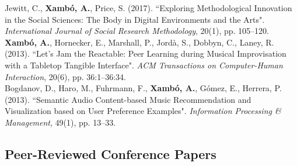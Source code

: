 \documentclass[10pt, a4paper]{article}
\newcommand{\years}[1]{\marginnote{\scriptsize #1}}
\begin{document}
{{\years{2017a}Jewitt, C., \textbf{Xambó, A.}, Price, S. (2017). “Exploring Methodological Innovation in the Social Sciences: The Body in Digital Environments and the Arts". \emph{International Journal of Social Research Methodology},  20(1), pp. 105--120.\\
\years{2013b}\textbf{Xambó, A.}, Hornecker, E., Marshall, P., Jordà, S., Dobbyn, C., Laney, R. (2013). “Let's Jam the Reactable: Peer Learning during Musical Improvisation with a Tabletop Tangible Interface". \emph{ACM Transactions on Computer-Human Interaction}, 20(6), pp. 36:1--36:34.\\
\years{2013a}Bogdanov, D., Haro, M., Fuhrmann, F., \textbf{Xambó, A.}, Gómez, E., Herrera, P. (2013). “Semantic Audio Content-based Music Recommendation and Visualization based on User Preference Examples". \emph{Information Processing \& Management}, 49(1), pp. 13--33.%

\subsection*{Peer-Reviewed Conference Papers}
\noindent

}}
\end{document}
